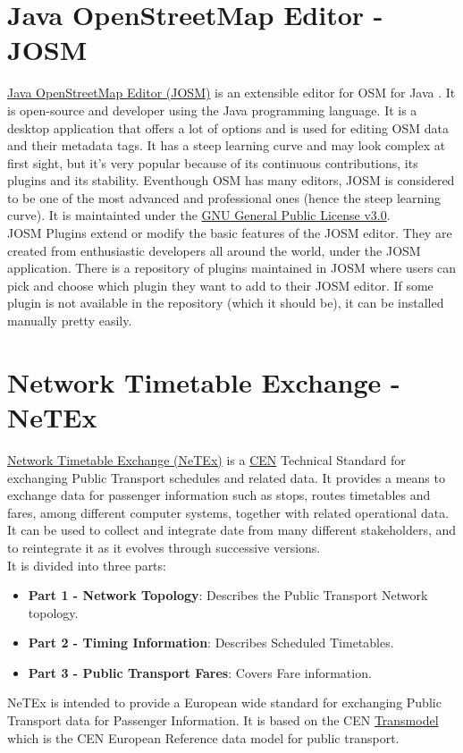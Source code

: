 \section{Java OpenStreetMap Editor - JOSM}
\href{https://josm.openstreetmap.de/}{Java OpenStreetMap Editor (JOSM)} is an extensible editor for OSM for Java  \cite{WhatIsJOSMIntro}. It is open-source and developer using the Java programming language. It is a desktop application that offers a lot of options and is used for editing OSM data and their metadata tags. It has a steep learning curve and may look complex at first sight, but it's very popular because of its continuous contributions, its plugins and its stability. Eventhough OSM has many editors, JOSM is considered to be one of the most advanced and professional ones (hence the steep learning curve). It is maintainted under the \href{https://www.gnu.org/licenses/gpl-3.0.en.html}{GNU General Public License v3.0}.\\	
\newline
JOSM Plugins extend or modify the basic features of the JOSM editor. They are created from enthusiastic developers all around the world, under the JOSM application. There is a repository of plugins maintained in JOSM where users can pick and choose which plugin they want to add to their JOSM editor. If some plugin is not available in the repository (which it should be), it can be installed manually pretty easily.
\section{Network Timetable Exchange - NeTEx}
\href{http://netex-cen.eu/}{Network Timetable Exchange (NeTEx)} is a \href{https://www.cen.eu/Pages/default.aspx}{CEN} Technical Standard for exchanging Public Transport schedules and related data. It provides a means to exchange data for passenger information such as stops, routes timetables and fares, among different computer systems, together with related operational data. It can be used to collect and integrate date from many different stakeholders, and to reintegrate it as  it evolves through successive versions. \cite{WhatIsNeTEx}\\
\newline
It is divided into three parts:
\begin{itemize}
	\item \textbf{Part 1 - Network Topology}: Describes the Public Transport Network topology.
	\item \textbf{Part 2 - Timing Information}: Describes Scheduled Timetables.
	\item \textbf{Part 3 - Public Transport Fares}: Covers Fare information.
\end{itemize}
NeTEx is intended to provide a European wide standard for exchanging Public Transport data for Passenger Information. It is based on the CEN \href{http://www.transmodel-cen.eu/}{Transmodel} which is the CEN European Reference data model for public transport.